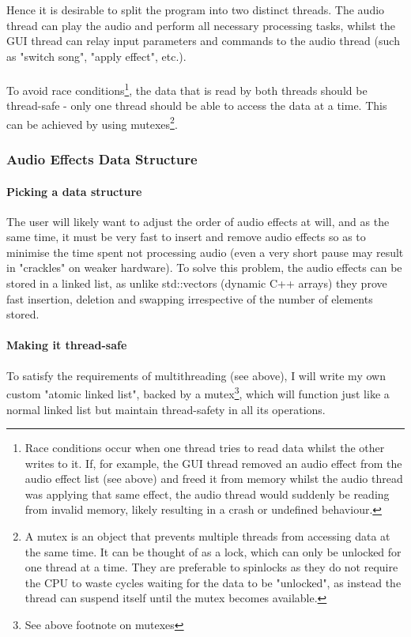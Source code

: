 Hence it is desirable to split the program into two distinct threads. The audio thread can play the audio and perform all necessary processing tasks, whilst the GUI thread can relay input parameters and commands to the audio thread (such as "switch song", "apply effect", etc.).

\paragraph{}
To avoid race conditions\footnote{
	 Race conditions occur when one thread tries to read data whilst the other writes to it. If, for example, the GUI thread removed an audio effect from the audio effect list (see above) and freed it from memory whilst the audio thread was applying that same effect, the audio thread would suddenly be reading from invalid memory, likely resulting in a crash or undefined behaviour.
}, the data that is read by both threads should be thread-safe - only one thread should be able to access the data at a time. This can be achieved by using mutexes\footnote{
	A mutex is an object that prevents multiple threads from accessing data at the same time. It can be thought of as a lock, which can only be unlocked for one thread at a time. They are preferable to spinlocks as they do not require the CPU to waste cycles waiting for the data to be "unlocked", as instead the thread can suspend itself until the mutex becomes available.
}.

\subsubsection{Audio Effects Data Structure}
\paragraph{Picking a data structure} The user will likely want to adjust the order of audio effects at will, and as the same time, it must be very fast to insert and  remove audio effects so as to minimise the time spent not processing audio (even a very short pause may result in "crackles" on weaker hardware). To solve this problem, the audio effects can be stored in a linked list, as unlike std::vectors (dynamic C++ arrays) they prove fast insertion, deletion and swapping irrespective of the number of elements stored.

\paragraph{Making it thread-safe}
To satisfy the requirements of multithreading (see above), I will write my own custom "atomic linked list", backed by a mutex\footnote{
	See above footnote on mutexes
}, which will function just like a normal linked list but maintain thread-safety in all its operations.



